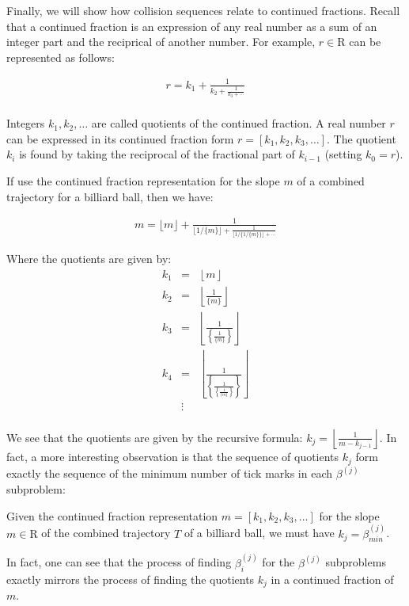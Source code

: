 Finally, we will show how collision sequences relate to continued fractions. Recall that a continued fraction is an expression of any real number as a sum of an integer part and the reciprical of another number. For example, $r \in \mathrm{R}$ can be represented as follows:

\begin{eqnarray}
r = k_1 + \frac{1}{k_2 + \frac{1}{k_3 + \cdots}} \\
\end{eqnarray}

Integers $k_1, k_2, \ldots$ are called quotients of the continued fraction. A real number $r$ can be expressed in its continued fraction form $r = [k_1, k_2, k_3, \ldots]$. The quotient $k_i$ is found by taking the reciprocal of the fractional part of $k_{i-1}$ (setting $k_0 = r$).

If use the continued fraction representation for the slope $m$ of a combined trajectory for a billiard ball, then we have:

\begin{eqnarray}
m = \lfloor m \rfloor + \frac{1}{\lfloor 1 / \{m\} \rfloor + \frac{1}{\lfloor 1/\{1/\{m\}\} \rfloor + \cdots}}
\end{eqnarray}

Where the quotients are given by:
\begin{eqnarray}
  k_1 &=& \left\lfloor m \right\rfloor \\
  k_2 &=& \left\lfloor \frac{1}{\{m\}} \right\rfloor \\
  k_3 &=& \left\lfloor \frac{1}{\left\{ \frac{1}{\{m\}} \right\}} \right\rfloor \\
  k_4 &=& \left\lfloor \frac{1}{\left\{ \frac{1}{\left\{\frac{1}{\{m\}}\right\}} \right\}} \right\rfloor \\
      &\vdots& \\
\end{eqnarray}

We see that the quotients are given by the recursive formula: $k_j = \left\lfloor \frac{1}{m - k_{j-1}} \right\rfloor$. In fact, a more interesting observation is that the sequence of quotients $k_j$ form exactly the sequence of the minimum number of tick marks in each $\beta^{(j)}$ subproblem:

\begin{theorem}
  Given the continued fraction representation $m = [k_1, k_2, k_3, \ldots]$ for the slope $m \in \mathrm{R}$ of the combined trajectory $T$ of a billiard ball, we must have $k_j = \beta_{min}^{(j)}$.
\end{theorem}

In fact, one can see that the process of finding $\beta^{(j)}_i$ for the $\beta^{(j)}$ subproblems exactly mirrors the process of finding the quotients $k_j$ in a continued fraction of $m$.
